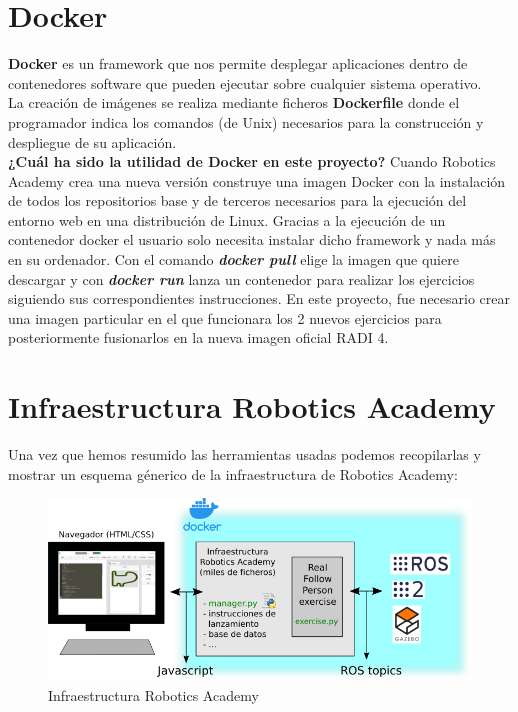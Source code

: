 \section{Docker}
\label{sec:docker}

\textbf{Docker} es un framework que nos permite desplegar aplicaciones dentro de contenedores software que pueden ejecutar sobre cualquier sistema operativo.\\

La creación de imágenes se realiza mediante ficheros \textbf{Dockerfile} donde el programador indica los comandos (de Unix) necesarios para la construcción y despliegue de su aplicación.\\

\textbf{¿Cuál ha sido la utilidad de Docker en este proyecto?} Cuando Robotics Academy crea una nueva versión construye una imagen Docker con la instalación de todos los repositorios base y de terceros necesarios para la ejecución del entorno web en una distribución de Linux. Gracias a la ejecución de un contenedor docker el usuario solo necesita instalar dicho framework y nada más en su ordenador. Con el comando \textbf{\textit{docker pull}} elige la imagen que quiere descargar y con \textbf{\textit{docker run}} lanza un contenedor para realizar los ejercicios siguiendo sus correspondientes instrucciones. En este proyecto, fue necesario crear una imagen particular en el que funcionara los 2 nuevos ejercicios para posteriormente fusionarlos en la nueva imagen oficial RADI 4.\\





\section{Infraestructura Robotics Academy}
\label{sec:infraestructura_robotics_academy}
Una vez que hemos resumido las herramientas usadas podemos recopilarlas y mostrar un esquema génerico de la infraestructura de Robotics Academy:

\begin{figure} [H]
  \begin{center}
    \includegraphics[width=15cm]{imagenes/esquema-robotics-academy.png}
  \end{center}
  \caption{Infraestructura Robotics Academy}
  \label{fig:infraestructura_robotics_academy}
\end{figure}\

